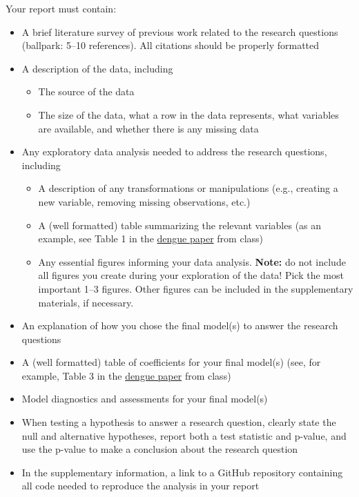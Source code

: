 \documentclass[11pt]{article}
\begin{document}
Your report must contain:
\begin{itemize}
\item A brief literature survey of previous work related to the research questions (ballpark: 5--10 references). All citations should be properly formatted 

\item A description of the data, including
\begin{itemize}
\item The source of the data
\item The size of the data, what a row in the data represents, what variables are available, and whether there is any missing data
\end{itemize}

\item Any exploratory data analysis needed to address the research questions, including
\begin{itemize}
\item A description of any transformations or manipulations (e.g., creating a new variable, removing missing observations, etc.)
\item A (well formatted) table summarizing the relevant variables (as an example, see Table 1 in the \href{https://journals.plos.org/plosntds/article?id=10.1371/journal.pntd.0003638}{dengue paper} from class)
\item Any essential figures informing your data analysis. \textbf{Note:} do not include all figures you create during your exploration of the data! Pick the most important 1--3 figures. Other figures can be included in the supplementary materials, if necessary.
\end{itemize}

\item An explanation of how you chose the final model(s) to answer the research questions

\item A (well formatted) table of coefficients for your final model(s) (see, for example, Table 3 in the \href{https://journals.plos.org/plosntds/article?id=10.1371/journal.pntd.0003638}{dengue paper} from class)

\item Model diagnostics and assessments for your final model(s)

\item When testing a hypothesis to answer a research question, clearly state the null and alternative hypotheses, report both a test statistic and p-value, and use the p-value to make a conclusion about the research question

\item In the supplementary information, a link to a GitHub repository containing all code needed to reproduce the analysis in your report
\end{itemize}
\end{document}
